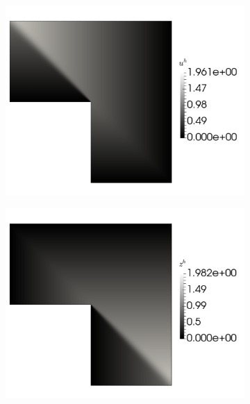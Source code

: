 \begin{figure}[hbt!]
\centering
\begin{subfigure}{.3\textwidth}
\centering
\includegraphics[width=.99\linewidth]{img/vms_lshape_uh}
\end{subfigure}%
\begin{subfigure}{.3\textwidth}
\centering
\includegraphics[width=.99\linewidth]{img/vms_lshape_global_zh}
\end{subfigure}%
\begin{subfigure}{.3\textwidth}
\centering

\end{subfigure}
\end{figure}
